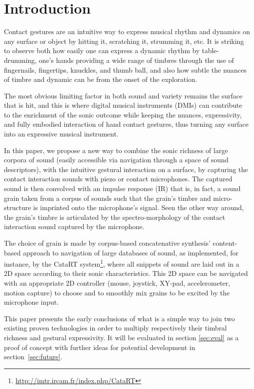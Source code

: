 \section{Introduction}\label{sec:intro}


Contact gestures are an intuitive way to express musical rhythm and dynamics on any surface or object by hitting it, scratching it, strumming it, etc.  It is striking to observe both how easily one can express a dynamic rhythm by table-drumming, one's hands providing a wide range of timbres through the use of fingernails, fingertips, knuckles, and thumb ball, and also how subtle the nuances of timbre and dynamic can be from the onset of the exploration.

The most obvious limiting factor in both sound and variety remains the surface that is hit, and this is where digital musical instruments (DMIs) can contribute to the enrichment of the sonic outcome while keeping the nuances, expressivity, and fully embodied interaction of hand contact gestures, thus turning any surface into an expressive musical instrument.

In this paper, we propose a new way to combine the sonic richness of large corpora of sound (easily accessible via navigation through a space of sound descriptors), with the intuitive gestural interaction on a surface, by capturing the contact interaction sounds with piezo or contact microphones. The captured sound is then convolved with an impulse response (IR) that is, in fact, a sound grain taken from a corpus of sounds such that the grain's timbre and micro-structure is imprinted onto the microphone's signal.
Seen the other way around, the grain's timbre is articulated by the spectro-morphology of the contact interaction sound captured by the microphone. 

The choice of grain is made by corpus-based concatenative synthesis' content-based approach to navigation of large databases of sound, as implemented, for instance, by the CataRT system\footnote{\url{http://imtr.ircam.fr/index.php/CataRT}}, where all snippets of sound are laid out in a 2D space according to their sonic characteristics.  This 2D space can be navigated with an appropriate 2D controller (mouse, joystick, XY-pad, accelerometer, motion capture) to choose and to smoothly mix grains to be excited by the microphone input.

This paper presents the early conclusions of what is a simple way to join two existing proven technologies in order to multiply respectively their timbral richness and gestural expressivity. It will be evaluated in section \ref{sec:eval} as a proof of concept with further ideas for potential development in section~\ref{sec:future}.




